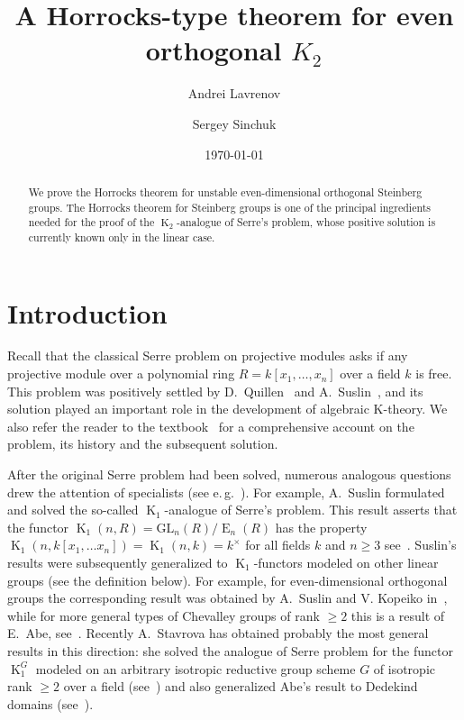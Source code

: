 \documentclass[oneside, 8pt]{amsart}
\title{A Horrocks-type theorem for even orthogonal $K_2$}
\author{Andrei Lavrenov}
\author {Sergey Sinchuk}
\date {\today}
\theoremstyle{remark}
\theoremstyle{definition}
\numberwithin{lemma}{section}
\numberwithin{prop}{section}
\numberwithin{corollary}{section}
\numberwithin{externaltheorem}{section}
\DeclareMathOperator{\E}{E}
\DeclareMathOperator{\K}{K}
\numberwithin{equation}{section}
\begin{document}
\begin{abstract} We prove the Horrocks theorem for unstable even-dimensional orthogonal Steinberg groups. The Horrocks theorem for Steinberg groups is one of the principal ingredients needed for the proof of the $\K_2$-analogue of Serre's problem,  whose positive solution is currently known only in the linear case. \end{abstract}
\maketitle
\section{Introduction}
Recall that the classical Serre problem on projective modules asks if any projective module over a polynomial ring $R = k[x_1,\ldots, x_n]$ over a field $k$ is free. This problem was positively settled by D.~Quillen~\cite{Qu76} and A.~Suslin~\cite{Su76}, and its solution played an important role in the development of algebraic K-theory. We also refer the reader to the textbook~\cite{Lam10} for a comprehensive account on the problem, its history and the subsequent solution.

After the original Serre problem had been solved, numerous analogous questions drew the attention of specialists (see e.\,g.~\cite{Su77, Su82, Abe83, Tu83, Lam10, St-poly, St-Ded}). For example, A.~Suslin formulated and solved the so-called $\K_1$-analogue of Serre's problem. This result asserts that the functor $\K_1(n, R) = \mathrm{GL}_{n}(R)/\E_n(R)$ has the property $\K_1(n, k[x_1, \ldots x_n]) = \K_1(n, k) = k^\times$ for all fields $k$ and $n \geq 3$ see~\cite[Corollary~7.11]{Su77}. Suslin's results were subsequently generalized to $\K_1$-functors modeled on other linear groups (see the definition below). For example, for even-dimensional orthogonal groups the corresponding result was obtained by A.~Suslin and V. Kopeiko in~\cite{Su82}, while for more general types of Chevalley groups of rank $\geq 2$ this is a result of E.~Abe, see~\cite{Abe83}. Recently A.~Stavrova has obtained probably the most general results in this direction: she solved the analogue of Serre problem for the functor $\K_1^G$ modeled on an arbitrary isotropic reductive group scheme $G$ of isotropic rank $\geq 2$ over a field (see~\cite[Theorem~1.2]{St-poly}) and also generalized Abe's result to Dedekind domains (see~\cite[Corollary~1.2]{St-Ded}).
\end{document}
